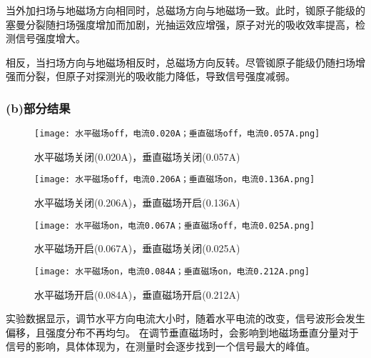 当外加扫场与地磁场方向相同时，总磁场方向与地磁场一致。此时，铷原子能级的塞曼分裂随扫场强度增加而加剧，光抽运效应增强，原子对光的吸收效率提高，检测信号强度增大。

相反，当扫场方向与地磁场相反时，总磁场方向反转。尽管铷原子能级仍随扫场增强而分裂，但原子对探测光的吸收能力降低，导致信号强度减弱。



\subsubsection{(b)部分结果}

\begin{figure}[H]
    \centering
    \begin{minipage}[b]{0.45\linewidth}
        \centering
        \texttt{[image: 水平磁场off，电流0.020A；垂直磁场off，电流0.057A.png]}
        \caption{水平磁场关闭(0.020A)，垂直磁场关闭(0.057A)}
        \label{fig:both_off}
    \end{minipage}
    \hfill
    \begin{minipage}[b]{0.45\linewidth}
        \centering
        \texttt{[image: 水平磁场off，电流0.206A；垂直磁场on，电流0.136A.png]}
        \caption{水平磁场关闭(0.206A)，垂直磁场开启(0.136A)}
        \label{fig:h_off_v_on}
    \end{minipage}

    \label{fig:horizontal_off}
\end{figure}

\begin{figure}[H]
    \centering
    \begin{minipage}[b]{0.45\linewidth}
        \centering
        \texttt{[image: 水平磁场on，电流0.067A；垂直磁场off，电流0.025A.png]}
        \caption{水平磁场开启(0.067A)，垂直磁场关闭(0.025A)}
        \label{fig:h_on_v_off}
    \end{minipage}
    \hfill
    \begin{minipage}[b]{0.45\linewidth}
        \centering
        \texttt{[image: 水平磁场on，电流0.084A；垂直磁场on，电流0.212A.png]}
        \caption{水平磁场开启(0.084A)，垂直磁场开启(0.212A)}
        \label{fig:both_on}
    \end{minipage}

    \label{fig:horizontal_on}
\end{figure}
实验数据显示，调节水平方向电流大小时，随着水平电流的改变，信号波形会发生偏移，且强度分布不再均匀。
在调节垂直磁场时，会影响到地磁场垂直分量对于信号的影响，具体体现为，在测量时会逐步找到一个信号最大的峰值。



